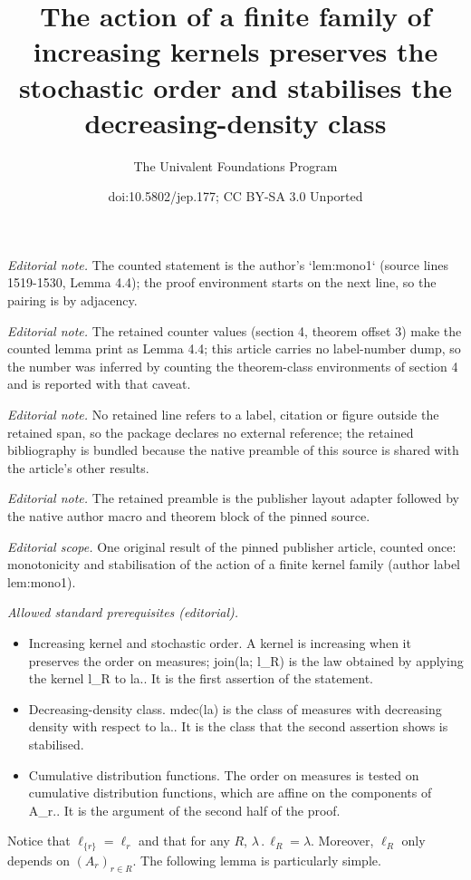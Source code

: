 \documentclass[10pt,a4paper]{article}
\title{The action of a finite family of increasing kernels preserves the stochastic order and stabilises the decreasing-density class}
\author{The Univalent Foundations Program}
\date{doi:10.5802/jep.177; CC BY-SA 3.0 Unported}
\newcommand{\ldot}{\mathbin{.}}
\theoremstyle{plain}
\theoremstyle{definition}
\newcommand{\la}{\lambda}
\begin{document}
\maketitle
\setcounter{section}{4}
\setcounter{them}{3}
\noindent\textit{Editorial note.} The counted statement is the author's `lem:mono1` (source lines 1519-1530, Lemma 4.4); the proof environment starts on the next line, so the pairing is by adjacency.\par\medskip
\noindent\textit{Editorial note.} The retained counter values (section 4, theorem offset 3) make the counted lemma print as Lemma 4.4; this article carries no label-number dump, so the number was inferred by counting the theorem-class environments of section 4 and is reported with that caveat.\par\medskip
\noindent\textit{Editorial note.} No retained line refers to a label, citation or figure outside the retained span, so the package declares no external reference; the retained bibliography is bundled because the native preamble of this source is shared with the article's other results.\par\medskip
\noindent\textit{Editorial note.} The retained preamble is the publisher layout adapter followed by the native author macro and theorem block of the pinned source.\par\medskip
\noindent\textit{Editorial scope.} One original result of the pinned publisher article, counted once: monotonicity and stabilisation of the action of a finite kernel family (author label lem:mono1).\par\medskip
\noindent\textit{Allowed standard prerequisites (editorial).}\begin{itemize}
\item Increasing kernel and stochastic order. A kernel is increasing when it preserves the order on measures; join(la; l\_R) is the law obtained by applying the kernel l\_R to la.. It is the first assertion of the statement.
\item Decreasing-density class. mdec(la) is the class of measures with decreasing density with respect to la.. It is the class that the second assertion shows is stabilised.
\item Cumulative distribution functions. The order on measures is tested on cumulative distribution functions, which are affine on the components of A\_r.. It is the argument of the second half of the proof.
\end{itemize}\medskip
Notice that $\ell_{\{r\}}=\ell_r$ and that for any $R$, $\la\ldot\ell_R=\la$. Moreover, $\ell_R$ only depends on $(A_r)_{r\in R}$. The following lemma is particularly simple.
\end{document}

